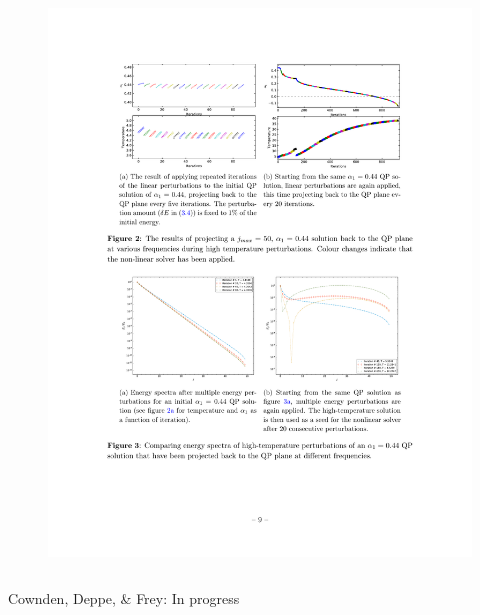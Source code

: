 \documentclass[mathserif,10pt]{beamer}
\newcommand{\scr}{\scriptsize}
\begin{document}
{\begin{columns}
\begin{figure}
  \centering
  \hspace{-0.1in}
  \includegraphics[scale=0.75]{reop20}
  \end{figure}
  \end{columns}
  \begin{center}
  \vspace{-0.12in}
  {\scr Cownden, Deppe, \& Frey: In progress}
  \end{center}
  \vspace{-0.1in}
}
\end{document}

